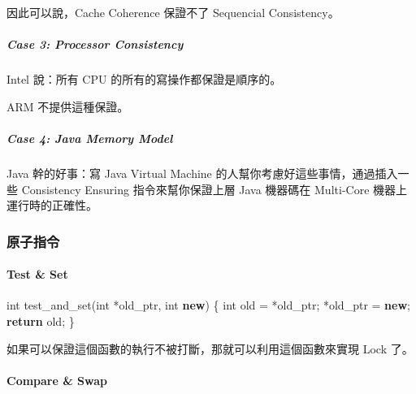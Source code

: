 \documentclass[
]{article}
\newenvironment{Shaded}{}{}
\newcommand{\ControlFlowTok}[1]{\textcolor[rgb]{0.00,0.44,0.13}{\textbf{#1}}}
\newcommand{\DataTypeTok}[1]{\textcolor[rgb]{0.56,0.13,0.00}{#1}}
\newcommand{\KeywordTok}[1]{\textcolor[rgb]{0.00,0.44,0.13}{\textbf{#1}}}
\newcommand{\NormalTok}[1]{#1}
\begin{document}
因此可以說，Cache Coherence 保證不了 Sequencial Consistency。

\hypertarget{header-n85}{%
\subparagraph{Case 3: Processor Consistency}\label{header-n85}}

Intel 說：所有 CPU 的所有的寫操作都保證是順序的。

ARM 不提供這種保證。

\hypertarget{header-n88}{%
\subparagraph{Case 4: Java Memory Model}\label{header-n88}}

Java 幹的好事：寫 Java Virtual Machine
的人幫你考慮好這些事情，通過插入一些 Consistency Ensuring
指令來幫你保證上層 Java 機器碼在 Multi-Core 機器上運行時的正確性。

\hypertarget{header-n90}{%
\subsubsection{原子指令}\label{header-n90}}

\hypertarget{header-n91}{%
\paragraph{Test \& Set}\label{header-n91}}

\begin{Shaded}
\begin{Highlighting}[]
\DataTypeTok{int}\NormalTok{ test_and_set(}\DataTypeTok{int}\NormalTok{ *old_ptr, }\DataTypeTok{int} \KeywordTok{new}\NormalTok{) \{}
    \DataTypeTok{int}\NormalTok{ old = *old_ptr;}
\NormalTok{    *old_ptr = }\KeywordTok{new}\NormalTok{;}
    \ControlFlowTok{return}\NormalTok{ old;}
\NormalTok{\}}
\end{Highlighting}
\end{Shaded}

如果可以保證這個函數的執行不被打斷，那就可以利用這個函數來實現 Lock 了。

\hypertarget{header-n94}{%
\paragraph{Compare \& Swap}\label{header-n94}}
\end{document}
